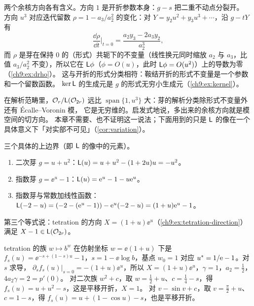 \begin{remark}[余核的解释]\label{ch9:rem:coker-meaning}
两个余核方向各有含义。方向 $1$ 是开折参数本身：$g-s$ 把二重不动点分裂开。
方向 $u^3$ 对应迭代留数 $\rho=1-a_3/a_2^2$ 的变化：对 $Y=y_2u^2+y_3u^3+\cdots$，沿 $g-tY$ 有
\[
 \frac{\dd\rho}{\dd t}\Big|_{t=0}=\frac{a_2y_3-2a_3y_2}{a_2^3},
\]
而 $\rho$ 是芽在保持 $0$ 的（形式）共轭下的不变量（线性换元同时缩放 $a_2$ 与 $a_3$，比值 $a_3/a_2^2$ 不变），所以它在 $\mathsf L\phi$（$\phi=O(u)$，此时 $\mathsf L\phi=O(u^2)$）上的导数为零（\cref{ch9:ex:drho}）。
这与开折的形式分类相符：鞍结开折的形式不变量是一个参数和一个留数函数\cite{ChristopherRousseau}。
$\ker\mathsf L$ 的生成元是 $g$ 的形式无穷小生成元（\cref{ch9:ex:kernel}）。

在解析范畴里，$\mathcal O_r/\mathsf L(\mathcal O_{2r})$ 远比 $\operatorname{span}\{1,u^3\}$ 大：芽的解析分类除形式不变量外还有 \'Ecalle--Voronin 模，
它是无穷维的\cite{Ecalle1981,Voronin1981}。启发式地说，多出来的余核方向就是模空间的切方向。
本章不需要、也不证明这一说法；下面用到的只是 $\mathsf L$ 的像在一个具体意义下「对实部不可见」（\cref{cor:variation}）。
\end{remark}

\begin{example}\label{ch9:ex:coboundaries}
三个具体的上边界（即 $\mathsf L$ 的像中的元素）。
\begin{enumerate}
\item 二次芽 $g=u+u^2$：$\mathsf L(u)=u+u^2-(1+2u)u=-u^2$。
\item 指数芽 $g=\ee^u-1$：$\mathsf L(u)=\mathrm{e}^u-1-u\mathrm{e}^u$。
\item 指数芽与常数加线性函数：$\mathsf L(-2-u)=(-2-(\mathrm{e}^u-1))-\mathrm{e}^u(-2-u)=(1+u)\mathrm{e}^u-1$。
\end{enumerate}
第三个等式说：tetration 的方向 $X=(1+u)\ee^u$（\cref{ch9:ex:tetration-direction}）满足 $X-1\in\mathsf L(\mathcal O_{2r})$。
\end{example}

\begin{example}\label{ch9:ex:tetration-direction}
tetration 的族 $w\mapsto b^w$ 在仿射坐标 $w=\ee(1+u)$ 下是 $f_s(u)=\ee^{-s+(1-s)u}-1$，$s=1-\ee\log b$，基点 $w_0=1$ 对应 $u^{*}=1/\mathrm{e}-1$。对 $s$ 求导，
$\partial_sf_s(u)|_{s=0}=-(1+u)\ee^u$，所以 $X=(1+u)\ee^u$，$\gamma=1$，$a_2=\tfrac12$，$4a_2\gamma=2=p'(0)$。
对二次族 $w^2+c$，取 $w=\tfrac12+u$、$c=\tfrac14-s$，得 $f_s(u)=u+u^2-s$，这是平移开折，$X=1$。
对 $v-\sin v+c$，取 $v=\tfrac\pi2+u$、$c=1-s$，得 $f_s(u)=u+(1-\cos u)-s$，也是平移开折。
\end{example}

